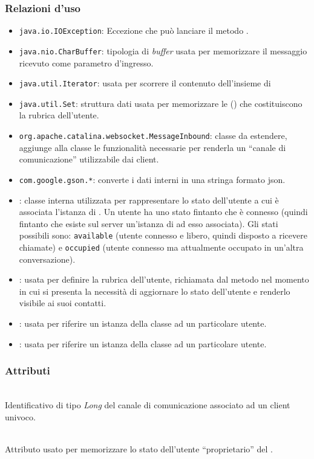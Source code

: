 \subsubsection*{Relazioni d'uso}
\begin{itemize}
	\item \texttt{java.io.IOException}: Eccezione che può lanciare il metodo .
	\item \texttt{java.nio.CharBuffer}: tipologia di \textit{buffer} usata per memorizzare il messaggio ricevuto come parametro d'ingresso.
	\item \texttt{java.util.Iterator}: usata per scorrere il contenuto dell'insieme di 
	\item \texttt{java.util.Set}: struttura dati usata per memorizzare le  () che costituiscono la rubrica dell'utente.
	\item \texttt{org.apache.catalina.websocket.MessageInbound}: classe da estendere, aggiunge alla classe  le funzionalità necessarie per renderla un ``canale di comunicazione'' utilizzabile dai client.
	\item \texttt{com.google.gson.*}: converte i dati interni in una stringa formato json.
	\item {}: classe interna utilizzata per rappresentare lo stato dell'utente a cui è associata l'istanza di . Un utente ha uno stato fintanto che è connesso (quindi fintanto che esiste sul server un'istanza di   ad esso associata). Gli stati possibili sono: \texttt{available} (utente connesso e libero, quindi disposto a ricevere chiamate) e \texttt{occupied} (utente connesso ma attualmente occupato in un'altra conversazione).
	\item {}: usata per definire la rubrica dell'utente, richiamata dal metodo  nel momento in cui si presenta la necessità di aggiornare lo stato dell'utente e renderlo visibile ai suoi contatti.
	\item {}: usata per riferire un istanza della classe ad un particolare utente.
	\item {}: usata per riferire un istanza della classe ad un particolare utente.

\end{itemize}

\subsubsection*{Attributi}
\begin{description}
  \item{}\\
  Identificativo di tipo \textit{Long} del canale di comunicazione associato ad un client univoco.
  \item{}\\
  Attributo usato per memorizzare lo stato dell'utente ``proprietario'' del .
\end{description}


